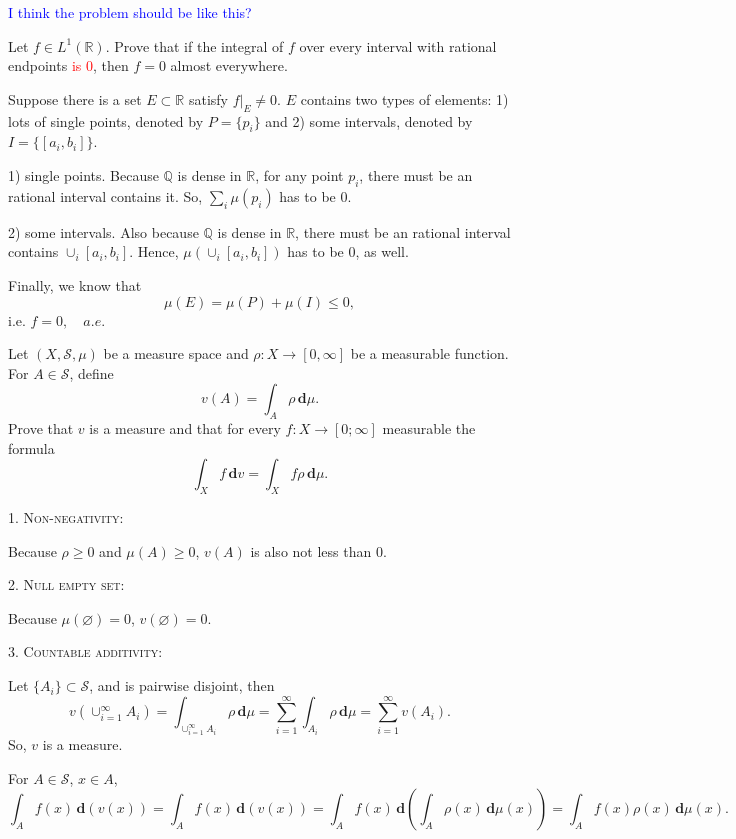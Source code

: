 \documentclass[12pt]{article}
\newenvironment{exercise}[1]{\begin{tcolorbox}[colback=black!15, colframe=black!80, breakable, title=#1]}{\end{tcolorbox}}
\newenvironment{solution}{\begin{tcolorbox}[colback=white, colframe=black!50, breakable, title=Solution. ]\setlength{\parskip}{0.8em}}{\end{tcolorbox}}
\newcommand{\der}{\,\mathbf{d}}
\begin{document}
    \begin{solution}
        \textcolor{blue}{I think the problem should be like this? }
        
        Let $f \in L^1(\mathbb{R})$. Prove that if the integral of $f$ over every interval with rational endpoints \textcolor{red}{is $0$}, then $f = 0$ almost everywhere. 
        
        Suppose there is a set $E\subset \mathbb{R}$ satisfy $f|_E\not=0$. $E$ contains two types of elements: 1) lots of single points, denoted by $P=\{p_i\}$ and 2) some intervals, denoted by $I=\{[a_i,b_i]\}$. 

        1) single points. Because $\mathbb{Q}$ is dense in $\mathbb{R}$, for any point $p_i$, there must be an rational interval contains it. So, $\sum_i\mu(p_i)$ has to be $0$. 

        2) some intervals. Also because $\mathbb{Q}$ is dense in $\mathbb{R}$, there must be an rational interval contains $\cup_i[a_i,b_i]$. Hence, $\mu(\cup_i[a_i,b_i])$ has to be $0$, as well. 

        Finally, we know that \[\mu(E)=\mu(P)+\mu(I)\leqslant0, \]
        i.e. $f=0,\quad a.e$. 
    \end{solution}

    \begin{exercise}{12}
        Let $(X, \mathscr{S}, \mu)$ be a measure space and $\rho : X \to [0, \infty]$ be a measurable function. For $A \in \mathscr{S}$, define
        \[
            v(A)=\int_A\rho\der \mu. 
        \]
        Prove that $v$ is a measure and that for every $f: X\to [0;\infty]$ measurable the formula
        \[
            \int_Xf\der v=\int_Xf\rho\der\mu. 
        \]
    \end{exercise}

    \begin{solution}
        \textsc{1. Non-negativity: }

        Because $\rho\geqslant 0$ and $\mu(A)\geqslant 0$, $v(A)$ is also not less than $0$. 

        \textsc{2. Null empty set: }

        Because $\mu(\varnothing)=0$, $v(\varnothing)=0$. 

        \textsc{3. Countable additivity: }

        Let $\{A_i\}\subset \mathscr{S}$, and is pairwise disjoint, then
        \[
            v(\cup_{i=1}^\infty A_i)=\int_{\cup_{i=1}^\infty A_i}\rho\der \mu=\sum_{i=1}^\infty\int_{A_i}\rho\der \mu=\sum_{i=1}^\infty v(A_i). 
        \]
        So, $v$ is a measure. 

        For $A\in\mathscr{S}$, $x\in A$, 
        \[
            \int_Af(x)\der(v(x))=\int_Af(x)\der(v(x))=\int_Af(x)\der(\int_A\rho(x)\der \mu(x))=\int_Af(x)\rho(x)\der \mu(x). 
        \]
    \end{solution}

\end{document}
